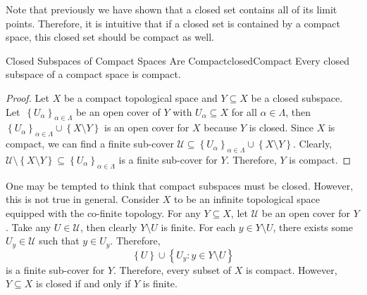 \documentclass[math]{amznotes}
\theoremstyle{remark}
\begin{document}
Note that previously we have shown that a closed set contains all of its limit points. Therefore, it is intuitive that if a closed set is contained by a compact space, this closed set should be compact as well.
\begin{probox}{Closed Subspaces of Compact Spaces Are Compact}{closedCompact}
    Every closed subspace of a compact space is compact.
    \tcblower
    \begin{proof}
        Let $X$ be a compact topological space and $Y \subseteq X$ be a closed subspace. Let~$\left\{U_{\alpha}\right\}_{\alpha \in \Lambda}$ be an open cover of $Y$ with $U_{\alpha} \subseteq X$ for all $\alpha \in \Lambda$, then $\left\{U_{\alpha}\right\}_{\alpha \in \Lambda} \cup \left\{X \setminus Y\right\}$ is an open cover for $X$ because $Y$ is closed. Since $X$ is compact, we can find a finite sub-cover $\mathcal{U} \subseteq \left\{U_{\alpha}\right\}_{\alpha \in \Lambda} \cup \left\{X \setminus Y\right\}$. Clearly, $\mathcal{U} \setminus \left\{X \setminus Y\right\} \subseteq \left\{U_{\alpha}\right\}_{\alpha \in \Lambda}$ is a finite sub-cover for $Y$. Therefore, $Y$ is compact. 
    \end{proof}
\end{probox}
One may be tempted to think that compact subspaces must be closed. However, this is not true in general. Consider $X$ to be an infinite topological space equipped with the co-finite topology. For any $Y \subseteq X$, let $\mathcal{U}$ be an open cover for $Y$. Take any $U \in \mathcal{U}$, then clearly $Y \setminus U$ is finite. For each $y \in Y \setminus U$, there exists some $U_y \in \mathcal{U}$ such that $y \in U_y$. Therefore, 
\begin{equation*}
    \left\{U\right\} \cup \left\{U_y \colon y \in Y \setminus U\right\}
\end{equation*}
is a finite sub-cover for $Y$. Therefore, every subset of $X$ is compact. However, $Y \subseteq X$ is closed if and only if $Y$ is finite.
\end{document}
